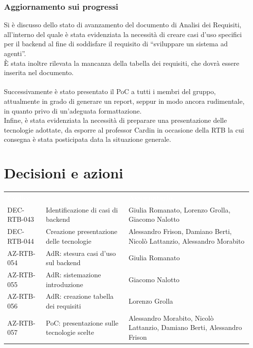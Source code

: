 \documentclass[a4paper, 11pt]{article}
\begin{document}
\subsubsection{Aggiornamento sui progressi}
Si è discusso dello stato di avanzamento del documento di Analisi dei Requisiti, all'interno del quale è stata evidenziata la necessità di creare casi d’uso specifici per il backend al fine di soddisfare il requisito di “sviluppare un sistema ad agenti”.
\\
È stata inoltre rilevata la mancanza della tabella dei requisiti, che dovrà essere inserita nel documento.
\\
\\
Successivamente è stato presentato il PoC a tutti i membri del gruppo, attualmente in grado di generare un report, seppur in modo ancora rudimentale, in quanto privo di un’adeguata formattazione.
\\
Infine, è stata evidenziata la necessità di preparare una presentazione delle tecnologie adottate, da esporre al professor Cardin in occasione della RTB la cui consegna è stata posticipata data la situazione generale.

\section{Decisioni e azioni} \label{DecisioniAzioni}
\begin{center}
    \begin{tabular}{>{\centering\arraybackslash}m{3cm} >{\raggedright\arraybackslash}p{7cm} >{\centering\arraybackslash}p{2.5cm}}
        \rowcolor{AccentColor}
        \textcolor{white}{\textbf{Codice }} & 
        \multicolumn{1}{c}{\textcolor{white}{\textbf{Descrizione}}} & 
        \textcolor{white}{\textbf{Assegnatario}} \\
        
        DEC-RTB-043 & Identificazione di casi di backend & Giulia Romanato, Lorenzo Grolla, Giacomo Nalotto \\
        DEC-RTB-044 & Creazione presentazione delle tecnologie & Alessandro Frison, Damiano Berti, Nicolò Lattanzio, Alessandro Morabito \\
        \midrule
        AZ-RTB-054 & AdR: stesura casi d'uso sul backend & Giulia Romanato\\
        AZ-RTB-055 & AdR: sistemazione introduzione & Giacomo Nalotto\\
        AZ-RTB-056 & AdR: creazione tabella dei requisiti & Lorenzo Grolla\\
        AZ-RTB-057 & PoC: presentazione sulle tecnologie scelte & Alessandro Morabito, Nicolò Lattanzio, Damiano Berti, Alessandro Frison\\
    \end{tabular}
\end{center}
\end{document}
